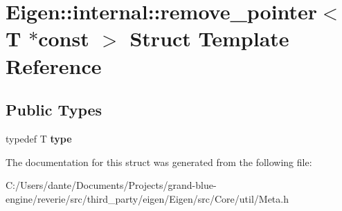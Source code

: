 \hypertarget{struct_eigen_1_1internal_1_1remove__pointer_3_01_t_01_5const_01_4}{}\section{Eigen\+::internal\+::remove\+\_\+pointer$<$ T $\ast$const $>$ Struct Template Reference}
\label{struct_eigen_1_1internal_1_1remove__pointer_3_01_t_01_5const_01_4}
\subsection*{Public Types}
\begin{DoxyCompactItemize}
\item 
\mbox{\label{struct_eigen_1_1internal_1_1remove__pointer_3_01_t_01_5const_01_4_ac2307323104253824b1c08e4970a24e7}} 
typedef T {\bfseries type}
\end{DoxyCompactItemize}


The documentation for this struct was generated from the following file\+:\begin{DoxyCompactItemize}
\item 
C\+:/\+Users/dante/\+Documents/\+Projects/grand-\/blue-\/engine/reverie/src/third\+\_\+party/eigen/\+Eigen/src/\+Core/util/Meta.\+h\end{DoxyCompactItemize}
